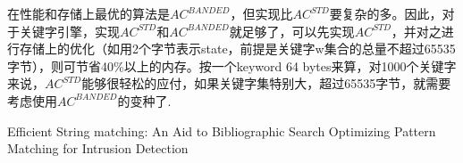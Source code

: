 \documentclass{article}
\begin{document}
在性能和存储上最优的算法是$AC^{BANDED}$，但实现比$AC^{STD}$要复杂的多。因此，对于关键字引擎，实现$AC^{STD}$和$AC^{BANDED}$就足够了，可以先实现$AC^{STD}$，并对之进行存储上的优化（如用2个字节表示state，前提是关键字w集合的总量不超过65535字节），则可节省40\%以上的内存。按一个keyword 64 bytes来算，对1000个关键字来说，$AC^{STD}$能够很轻松的应付，如果关键字集特别大，超过65535字节，就需要考虑使用$AC^{BANDED}$的变种了.


\begin{thebibliography}{99}
 Efficient String matching: An Aid to Bibliographic Search
 Optimizing Pattern Matching for Intrusion Detection
\end{thebibliography}
\end{document}
